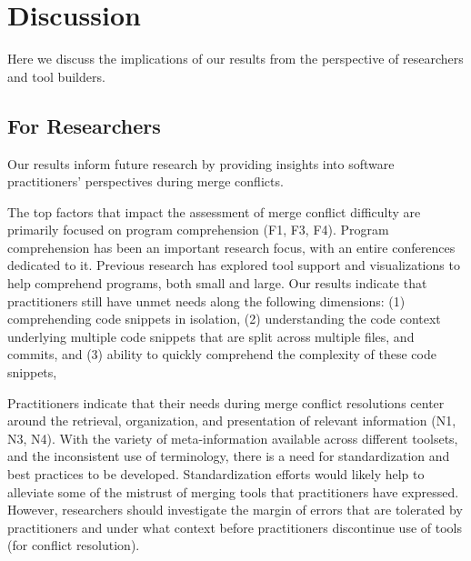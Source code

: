 \section{Discussion}\label{implications}
Here we discuss the implications of our results from the perspective of researchers and tool builders.

\subsection{For Researchers}
Our results inform future research by providing insights into software practitioners' perspectives during merge conflicts.

The top factors that impact the assessment of merge conflict difficulty are primarily focused on program comprehension (F1, F3, F4).
Program comprehension has been an important research focus, with an entire conferences dedicated to it.
Previous research has explored tool support and visualizations to help comprehend programs, both small and large.
Our results indicate that practitioners still have unmet needs along the following dimensions: (1) comprehending code snippets in isolation, (2) understanding the code context underlying multiple code snippets that are split across multiple files, and commits, and (3) ability to quickly comprehend the complexity of these code snippets, 


Practitioners indicate that their needs during merge conflict resolutions center around the retrieval, organization, and presentation of relevant information (N1, N3, N4).
With the variety of meta-information available across different toolsets, and the inconsistent use of terminology, there is a need for standardization and best practices to be developed.
Standardization efforts would likely help to alleviate some of the mistrust of merging tools that practitioners have expressed.
However, researchers should investigate the margin of errors that are tolerated by practitioners and under what context before practitioners discontinue use of tools (for conflict resolution).

